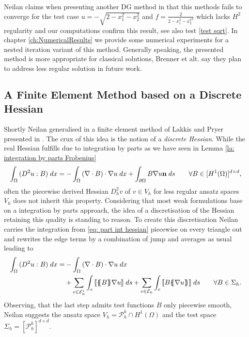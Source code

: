 Neilan claims when presenting another DG method in \cite{Neilan2014} that this methods fails to converge for the test case $u = -\sqrt{2 - x_1^2 - x_2^2 }$ and $f = \frac 2 {{2 - x_1^2 - x_2^2}^2}$ which lacks $H^2$ regularity and our computations confirm this result, see also test \ref{test sqrt}. In chapter \ref{ch:NumericalResults} we provide some numerical experiments for a nested iteration variant of this method. Generally speaking, the presented method is more appropriate for classical solutions, Brenner et alt. say they plan to address less regular solution in future work. 


\subsection{A Finite Element Method based on a Discrete Hessian} \label{subsec: disrete Hessian} \label{sec: FEM discrete Hessian}

Shortly Neilan generalised in \cite{Neilan2014} a finite element method of Lakkis and Pryer presented in \cite{LP2011}.
The crux of this idea is the notion of a \emph{discrete Hessian}. 
While the real Hessian fulfills due to integration by parts as we have seen in Lemma \ref{la: integration by parts Frobenius}
	\begin{align}
		\int_{\Omega} {{ (D^2 u : B)}\;dx} = 
			- \int_{\Omega} {{ \left(\nabla \cdot B\right) \cdot \nabla u}\;dx} 
			+ \int_{\partial \Omega} {{B \nabla u \mathbf {n}}\;ds} \qquad \forall B \in [H^1(\Omega)]^{d \times d}, \label{eq: part int hessian}
	\end{align}
often the piecewise derived Hessian $D_h^2 v$ of $ v \in V_h$ for less regular ansatz spaces $V_h$ does not inherit this property. Considering that most weak formulations base on a integration by parts approach, the idea of a discretisation of the Hessian retaining this quality is standing to reason. To create this discretisation Neilan carries the integration from \eqref{eq: part int hessian} piecewise on every triangle out and rewrites the edge terms by a combination of jump and averages as usual leading to
	\begin{align}
		\begin{split}
		\myIntX  \Omega { (D^2 u : B)}
		=& - \myIntX  \Omega { \left(\nabla \cdot B\right) \cdot \nabla u} \\
		&+ \sum_{ e \in \edgesi} \myIntS e { \jump {\average B \nabla u }}
				+ \sum_{ e \in \edges} \myIntS e {  \jump{B \average {\nabla u} }}  \qquad \forall B \in \Sigma_h. \label{eq: part int hessian omega}
		\end{split}
	\end{align}
Observing, that the last step admits test functions $B$ only piecewise smooth, Neilan suggests the ansatz space $V_h = \mathcal{P}_h^k \cap H^1(\Omega)$ and the test space $\Sigma_h = [\mathcal{P}_h^k]^{d \times d}$.

